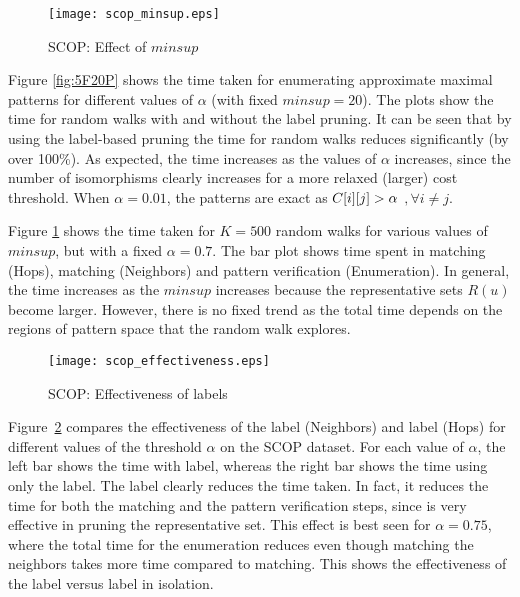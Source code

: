 \begin{figure}[!ht]
  \centerline{
    \texttt{[image: scop\_minsup.eps]}
	}
	\caption{SCOP: Effect of $minsup$}
    \label{fig:5F20P_ft}
\end{figure}


\smallskip{}
Figure \ref{fig:5F20P} shows the time taken for enumerating approximate
maximal patterns for different values of $\alpha$ (with fixed $minsup =
20$). The plots show the time for random walks with and without the
label pruning. It can be seen that by using the label-based pruning the
time for random walks reduces significantly (by over 100\%).  As
expected, the time increases as the values of $\alpha$ increases, since
the number of isomorphisms clearly increases for a more relaxed (larger)
cost threshold.  When $\alpha = 0.01$, the patterns are exact as
${C}[i][j] > \alpha$ $,\forall i \neq j$.

Figure \ref{fig:5F20P_ft} shows the time taken for $K=500$ random walks
for various values of $minsup$, but with a fixed $\alpha = 0.7$. The bar
plot shows time spent in \khop matching (Hops), \ncl matching
(Neighbors) and pattern verification (Enumeration). In general, the time
increases as the $minsup$ increases because the representative sets
$R(u)$ become larger. However, there is no fixed trend as the total time
depends on the regions of pattern space that the random walk explores.

\begin{figure}[!ht]
  \centerline{
    \texttt{[image: scop\_effectiveness.eps]}
	}
	\caption{SCOP: Effectiveness of labels}
    \label{fig:D5F20P_eff}
\end{figure}

Figure~\ref{fig:D5F20P_eff} compares the effectiveness of the \combined
label (Neighbors) and \khop label (Hops) for different values of the
threshold $\alpha$ on the SCOP dataset.  For each value of $\alpha$, the
left bar shows the time with \combined label, whereas the right bar
shows the time using only the \khop label.  The \combined label clearly
reduces the time taken. In fact, it reduces the time for both the \khop
matching and the pattern verification steps, since \combined is very
effective in pruning the representative set.  This effect is best seen
for $\alpha = 0.75$, where the total time for the enumeration reduces
even though matching the neighbors takes more time compared to \khop
matching.  This shows the effectiveness of the \combined label versus
\khop label in isolation.

